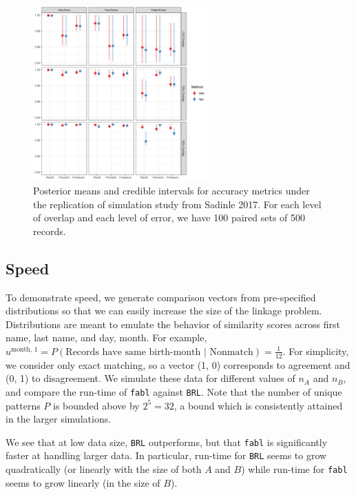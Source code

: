 \documentclass[12pt,letterpaper]{article}
\newcommand{\1}[1]{\mathbb{I}\!\left[#1\right]} %
\begin{document}
\begin{figure}[ht]
	
	{\centering 
		
		\includegraphics[width=0.6\textwidth]{../notes/figures/sadinle_sim_plot} 
	}
	
	\caption{Posterior means and credible intervals for accuracy metrics under the replication of simulation study from Sadinle 2017. For each level of overlap and each level of error, we have 100 paired sets of 500 records.}\label{fig:sadinle_simulation}
	
\end{figure}

\hypertarget{speed}{%
	\subsection{Speed}\label{speed}}

To demonstrate speed, we generate comparison vectors from pre-specified
distributions so that we can easily increase the size of the linkage
problem. Distributions are meant to emulate the behavior of similarity
scores across first name, last name, and day, month. For example, $u^{\text{month, 1}} = P(\text{Records have same birth-month | Nonmatch}) = \frac{1}{12}$. For simplicity, we
consider only exact matching, so a vector (1, 0) corresponds to
agreement and (0, 1) to disagreement. We simulate these data for
different values of \(n_A\) and \(n_B\), and compare the run-time of
\texttt{fabl} against \texttt{BRL}. Note that the number of unique
patterns \(P\) is bounded above by \(2^5 = 32\), a bound which is
consistently attained in the larger simulations.

We see that at low data size, \texttt{BRL} outperforms, but that
\texttt{fabl} is significantly faster at handling larger data. In
particular, run-time for \texttt{BRL} seems to grow quadratically (or
linearly with the size of both \(A\) and \(B\)) while run-time for
\texttt{fabl} seems to grow linearly (in the size of \(B\)).
\end{document}
